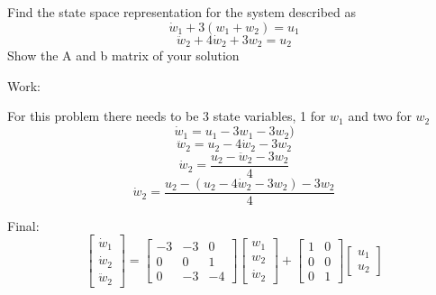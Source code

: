 
\item Find the state space representation for the system described as
  \begin{equation}
    \dot w_1 + 3(w_1 + w_2) = u_1
  \end{equation}
  \begin{equation}
    \ddot w_2 + 4\dot w_2 + 3w_2 = u_2
  \end{equation}
  Show the A and b matrix of your solution

  Work:

  For this problem there needs to be 3 state variables, 1 for $w_1$ and two for $w_2$
  \begin{equation}
    \dot w_1 = u_1 - 3w_1 - 3w_2)
  \end{equation}
  \begin{equation}
    \ddot w_2 = u_2 - 4\dot w_2 - 3w_2 
  \end{equation}
  \begin{equation}
    \dot w_2 = \frac{u_2 - \ddot w_2 - 3w_2} 4
  \end{equation}
  \begin{equation}
    \dot w_2 = \frac{u_2 - (u_2 - 4\dot w_2 - 3w_2) - 3w_2} 4
  \end{equation}

  Final:
  \begin{equation}
    \begin{bmatrix}
      \dot w_1 \\
      \dot w_2 \\
      \ddot w_2
    \end{bmatrix} =
    \begin{bmatrix}
      -3 & -3 &  0\\
       0 &  0 &  1 \\
       0 & -3 & -4
    \end{bmatrix}
    \begin{bmatrix}
      w_1 \\
      w_2 \\
      \dot w_2
    \end{bmatrix} +
    \begin{bmatrix}
      1 & 0 \\
      0 & 0 \\
      0 & 1
    \end{bmatrix}
    \begin{bmatrix}
      u_1 \\
      u_2
    \end{bmatrix}
  \end{equation}

